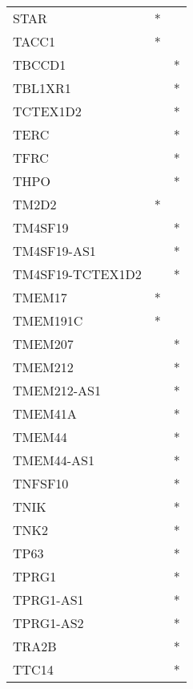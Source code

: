 \begin{longtable}{lcc}
STAR             &              * &            \\
TACC1            &              * &            \\
TBCCD1           &                &          * \\
TBL1XR1          &                &          * \\
TCTEX1D2         &                &          * \\
TERC             &                &          * \\
TFRC             &                &          * \\
THPO             &                &          * \\
TM2D2            &              * &            \\
TM4SF19          &                &          * \\
TM4SF19-AS1      &                &          * \\
TM4SF19-TCTEX1D2 &                &          * \\
TMEM17           &              * &            \\
TMEM191C         &              * &            \\
TMEM207          &                &          * \\
TMEM212          &                &          * \\
TMEM212-AS1      &                &          * \\
TMEM41A          &                &          * \\
TMEM44           &                &          * \\
TMEM44-AS1       &                &          * \\
TNFSF10          &                &          * \\
TNIK             &                &          * \\
TNK2             &                &          * \\
TP63             &                &          * \\
TPRG1            &                &          * \\
TPRG1-AS1        &                &          * \\
TPRG1-AS2        &                &          * \\
TRA2B            &                &          * \\
TTC14            &                &          * \\

\end{longtable}
